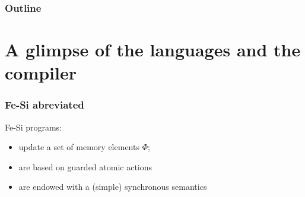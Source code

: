 \documentclass[9pt]{beamer}
\newcommand\fesi{Fe-Si}
\begin{document}

\begin{frame}
  \frametitle{Outline}       
  \tableofcontents  
\end{frame}


\section{A glimpse of the languages and the compiler}
\begin{frame}[fragile]
  \frametitle{\fesi{} abreviated}

  \fesi{} programs:
  \begin{itemize}
  \item update a set of \alert{memory elements} $\Phi$;
    \\
  \item are based on \alert{guarded atomic actions} 
    \\
    \begin{center}
    \end{center}
  \item are endowed with a (simple) \alert{synchronous semantics}
    \\
    \begin{center}
    \end{center}
  \end{itemize}
\end{frame}
\end{document}
